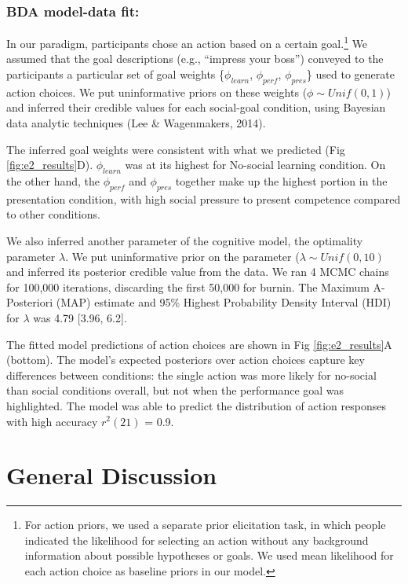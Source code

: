 \documentclass[10pt, letterpaper]{article}
\begin{document}
\subsubsection{BDA model-data fit:}\label{bda-model-data-fit}

In our paradigm, participants chose an action based on a certain
goal.\footnote{For action priors, we used a separate prior elicitation task, in which people indicated the likelihood for selecting an action without any background information about possible hypotheses or goals. We used mean likelihood for each action choice as baseline priors in our model.}
We assumed that the goal descriptions (e.g., ``impress your boss'')
conveyed to the participants a particular set of goal weights
\{\(\phi_{learn}\), \(\phi_{perf}\), \(\phi_{pres}\)\} used to generate
action choices. We put uninformative priors on these weights
(\(\phi \sim Unif(0,1)\)) and inferred their credible values for each
social-goal condition, using Bayesian data analytic techniques (Lee \&
Wagenmakers, 2014).

The inferred goal weights were consistent with what we predicted (Fig
\ref{fig:e2_results}D). \(\phi_{learn}\) was at its highest for
No-social learning condition. On the other hand, the \(\phi_{perf}\) and
\(\phi_{pres}\) together make up the highest portion in the presentation
condition, with high social pressure to present competence compared to
other conditions.

We also inferred another parameter of the cognitive model, the
optimality parameter \(\lambda\). We put uninformative prior on the
parameter (\(\lambda \sim Unif(0,10)\) and inferred its posterior
credible value from the data. We ran 4 MCMC chains for 100,000
iterations, discarding the first 50,000 for burnin. The Maximum A-
Posteriori (MAP) estimate and 95\% Highest Probability Density Interval
(HDI) for \(\lambda\) was 4.79 {[}3.96, 6.2{]}.

The fitted model predictions of action choices are shown in Fig
\ref{fig:e2_results}A (bottom). The model's expected posteriors over
action choices capture key differences between conditions: the single
action was more likely for no-social than social conditions overall, but
not when the performance goal was highlighted. The model was able to
predict the distribution of action responses with high accuracy
\(r^2(21)\) = 0.9.

\section{General Discussion}\label{general-discussion}
\end{document}
